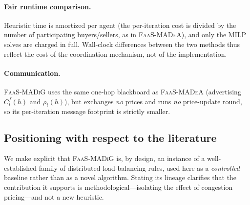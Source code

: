 \paragraph{Fair runtime comparison.} Heuristic time is amortized per agent
(the per-iteration cost is divided by the number of participating
buyers/sellers, as in \textsc{FaaS-MADeA}), and only the MILP solves are charged
in full. Wall-clock differences between the two methods thus reflect the cost of
the coordination mechanism, not of the implementation.

\paragraph{Communication.} \textsc{FaaS-MADiG} uses the same one-hop blackboard
as \textsc{FaaS-MADeA} (advertising $C_i^f(h)$ and $\rho_i(h)$), but exchanges
\emph{no} prices and runs \emph{no} price-update round, so its per-iteration
message footprint is strictly smaller.

\subsection{Positioning with respect to the literature}
\label{sec:madig-related}

We make explicit that \textsc{FaaS-MADiG} is, by design, an instance of a
well-established family of distributed load-balancing rules, used here as a
\emph{controlled} baseline rather than as a novel algorithm. Stating its lineage
clarifies that the contribution it supports is methodological---isolating the
effect of congestion pricing---and not a new heuristic.

